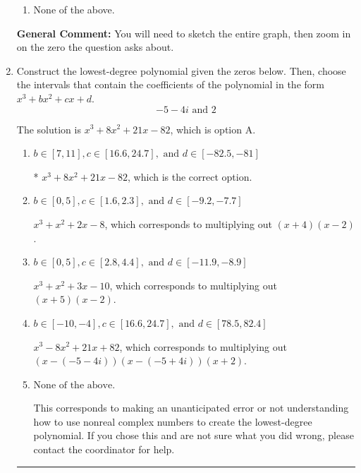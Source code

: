 \documentclass{extbook}[14pt]
\newcommand{\litem}[1]{\item #1

\rule{\textwidth}{0.4pt}}
\begin{document}
\begin{enumerate}
{\begin{enumerate}[label=\Alph*.]
\item None of the above.\end{enumerate}
\textbf{General Comment:} You will need to sketch the entire graph, then zoom in on the zero the question asks about.
}
\litem{
Construct the lowest-degree polynomial given the zeros below. Then, choose the intervals that contain the coefficients of the polynomial in the form $x^3+bx^2+cx+d$.
\[ -5 - 4 i \text{ and } 2 \]

The solution is \( x^{3} +8 x^{2} +21 x -82 \), which is option A.\begin{enumerate}[label=\Alph*.]
\item \( b \in [7, 11], c \in [16.6, 24.7], \text{ and } d \in [-82.5, -81] \)

* $x^{3} +8 x^{2} +21 x -82$, which is the correct option.
\item \( b \in [0, 5], c \in [1.6, 2.3], \text{ and } d \in [-9.2, -7.7] \)

$x^{3} + x^{2} +2 x -8$, which corresponds to multiplying out $(x + 4)(x -2)$.
\item \( b \in [0, 5], c \in [2.8, 4.4], \text{ and } d \in [-11.9, -8.9] \)

$x^{3} + x^{2} +3 x -10$, which corresponds to multiplying out $(x + 5)(x -2)$.
\item \( b \in [-10, -4], c \in [16.6, 24.7], \text{ and } d \in [78.5, 82.4] \)

$x^{3} -8 x^{2} +21 x + 82$, which corresponds to multiplying out $(x-(-5 - 4 i))(x-(-5 + 4 i))(x + 2)$.
\item \( \text{None of the above.} \)

This corresponds to making an unanticipated error or not understanding how to use nonreal complex numbers to create the lowest-degree polynomial. If you chose this and are not sure what you did wrong, please contact the coordinator for help.
\end{enumerate}

}
\end{enumerate}
\end{document}
